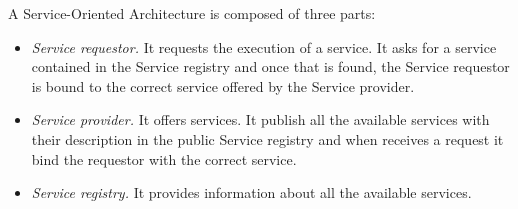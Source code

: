 \documentclass[\mainpath/main]{subfiles}
\begin{document}
A Service-Oriented Architecture is composed of three parts:
\begin{itemize}
	\item \textit{Service requestor.} It  requests the execution of a service. It asks for a service contained in the Service registry and once that is found, the Service requestor is bound to the correct service offered by the Service provider. 
	\item \textit{Service provider.} It offers services. It publish all the available services with their description in the public Service registry and when receives a request it bind the requestor with the correct service.
	\item \textit{Service registry.} It provides information about all the available services.
\end{itemize}
\end{document}
